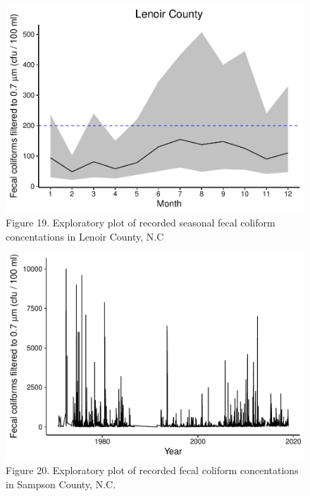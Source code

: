 \documentclass[12pt,]{article}
\begin{document}
\begin{figure}
\centering
\includegraphics{Edmondson_ENV872_Project_files/figure-latex/unnamed-chunk-18-1.pdf}
\caption{Figure 19. Exploratory plot of recorded seasonal fecal coliform
concentations in Lenoir County, N.C}
\end{figure}

\begin{figure}
\centering
\includegraphics{Edmondson_ENV872_Project_files/figure-latex/unnamed-chunk-19-1.pdf}
\caption{Figure 20. Exploratory plot of recorded fecal coliform
concentations in Sampson County, N.C.}
\end{figure}
\end{document}
